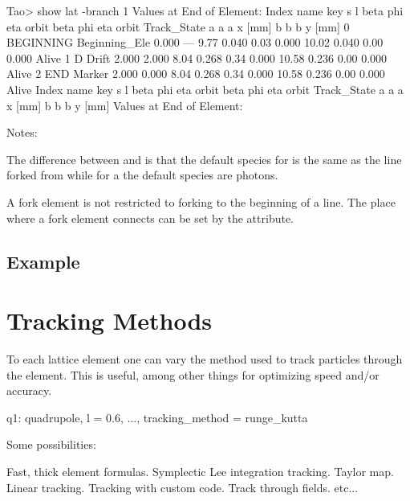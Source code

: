 \documentclass{hitec}
\newcommand{\Section}[1]{\section{#1}\vspace*{-1ex}}
\begin{document}
    Tao> show lat -branch 1
          Values at End of Element:
     Index  name      key                       s       l    beta     phi    eta  orbit     beta     phi    eta  orbit    Track_State
                                                                a       a      a  x [mm]       b       b      b  y [mm]
         0  BEGINNING Beginning_Ele         0.000     ---    9.77   0.040   0.03   0.000   10.02   0.040   0.00   0.000   Alive
         1  D         Drift                 2.000   2.000    8.04   0.268   0.34   0.000   10.58   0.236   0.00   0.000   Alive
         2  END       Marker                2.000   0.000    8.04   0.268   0.34   0.000   10.58   0.236   0.00   0.000   Alive
     Index  name      key                       s       l    beta     phi    eta  orbit     beta     phi    eta  orbit    Track_State
                                                                a       a      a  x [mm]       b       b      b  y [mm]
          Values at End of Element:

Notes:
\item The difference between  and  is that the default species for  is
the same as the line forked from while for a  the default species are photons.
\item A fork element is not restricted to forking to the beginning of a line. 
The place where a fork element connects can be set by the  attribute.


\subsection{Example}



\Section{Tracking Methods}

To each lattice element one can vary the method used to track particles through the element. This is useful, among other things for optimizing speed and/or accuracy.

    q1: quadrupole, l = 0.6, ..., tracking_method = runge_kutta

Some possibilities:

       Fast, thick element formulas.
        Symplectic Lee integration tracking.
              Taylor map.
              Linear tracking.
              Tracking with custom code.
         Track through fields.
    etc...
\end{document}
